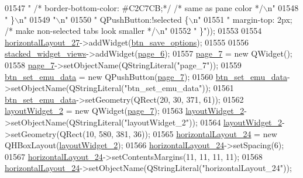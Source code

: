 \begin{DoxyCode}
01547 \textcolor{stringliteral}{"   /*  border-bottom-color: #C2C7CB;*/ /* same as pane color */\(\backslash\)n"}
01548 \textcolor{stringliteral}{" \}\(\backslash\)n"}
01549 \textcolor{stringliteral}{"\(\backslash\)n"}
01550 \textcolor{stringliteral}{" QPushButton:!selected \{\(\backslash\)n"}
01551 \textcolor{stringliteral}{"     margin-top: 2px; /* make non-selected tabs look smaller */\(\backslash\)n"}
01552 \textcolor{stringliteral}{" \}"}));
01553 
01554         \hyperlink{a00080_acbfe65f9d2895246b00c82c815b5369e}{horizontalLayout\_27}->addWidget(\hyperlink{a00080_a409e5b794dbab22d7b958be406b6a030}{btn\_save\_options});
01555 
01556         \hyperlink{a00080_a59e39bd3d716004e840a5be5dda18b96}{stacked\_widget\_views}->addWidget(\hyperlink{a00080_a48c3dca01f963265cd2ffca998842e05}{page\_6});
01557         \hyperlink{a00080_a2a58b14a203be787ef1600453f795d71}{page\_7} = \textcolor{keyword}{new} QWidget();
01558         \hyperlink{a00080_a2a58b14a203be787ef1600453f795d71}{page\_7}->setObjectName(QStringLiteral(\textcolor{stringliteral}{"page\_7"}));
01559         \hyperlink{a00080_ad05944ce9c8afb0ab60549a326b8e0af}{btn\_set\_emu\_data} = \textcolor{keyword}{new} QPushButton(\hyperlink{a00080_a2a58b14a203be787ef1600453f795d71}{page\_7});
01560         \hyperlink{a00080_ad05944ce9c8afb0ab60549a326b8e0af}{btn\_set\_emu\_data}->setObjectName(QStringLiteral(\textcolor{stringliteral}{"btn\_set\_emu\_data"}));
01561         \hyperlink{a00080_ad05944ce9c8afb0ab60549a326b8e0af}{btn\_set\_emu\_data}->setGeometry(QRect(20, 30, 371, 61));
01562         \hyperlink{a00080_a873441ec9cec68e0d4eacee271765553}{layoutWidget\_2} = \textcolor{keyword}{new} QWidget(\hyperlink{a00080_a2a58b14a203be787ef1600453f795d71}{page\_7});
01563         \hyperlink{a00080_a873441ec9cec68e0d4eacee271765553}{layoutWidget\_2}->setObjectName(QStringLiteral(\textcolor{stringliteral}{"layoutWidget\_2"}));
01564         \hyperlink{a00080_a873441ec9cec68e0d4eacee271765553}{layoutWidget\_2}->setGeometry(QRect(10, 580, 381, 36));
01565         \hyperlink{a00080_a9403b9a7c13814220caeb1748ef9e672}{horizontalLayout\_24} = \textcolor{keyword}{new} QHBoxLayout(\hyperlink{a00080_a873441ec9cec68e0d4eacee271765553}{layoutWidget\_2});
01566         \hyperlink{a00080_a9403b9a7c13814220caeb1748ef9e672}{horizontalLayout\_24}->setSpacing(6);
01567         \hyperlink{a00080_a9403b9a7c13814220caeb1748ef9e672}{horizontalLayout\_24}->setContentsMargins(11, 11, 11, 11);
01568         \hyperlink{a00080_a9403b9a7c13814220caeb1748ef9e672}{horizontalLayout\_24}->setObjectName(QStringLiteral(\textcolor{stringliteral}{"horizontalLayout\_24"}));

\end{DoxyCode}
